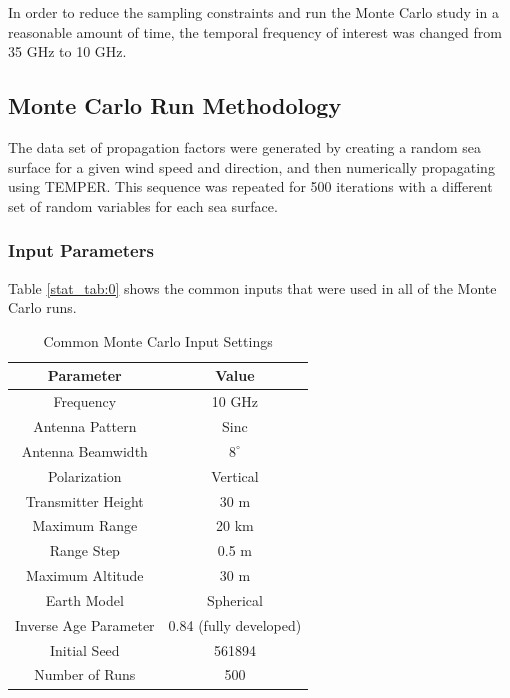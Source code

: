 In order to reduce the sampling constraints and run the Monte Carlo study in a reasonable amount of time, the temporal frequency of interest was changed from 35 GHz to 10 GHz.

\subsection{Monte Carlo Run Methodology}
The data set of propagation factors were generated by creating a random sea surface for a given wind speed and direction, and then numerically propagating using TEMPER. This sequence was repeated for 500 iterations with a different set of random variables for each sea surface.

\subsubsection{Input Parameters}
Table \ref{stat_tab:0} shows the common inputs that were used in all of the Monte Carlo runs.

\begin{table}[H]
  \begin{center}
      \renewcommand{\baselinestretch}{1} \small\normalsize
  \begin{quote}
    \caption[Common Monte Carlo Input Settings]{Common Monte Carlo Input Settings\label{stat_tab:1}}
  \end{quote}
  \begin{tabular} {|c | c |}
    \hline
  \bf{Parameter} & \bf{Value} \\ \hline
  Frequency & 10 GHz \\ \hline
  Antenna Pattern & Sinc \\ \hline
  Antenna Beamwidth & $8^{\circ}$  \\ \hline
  Polarization & Vertical \\ \hline
  Transmitter Height & 30 m \\ \hline
  Maximum Range & 20 km \\ \hline
  Range Step & 0.5 m  \\ \hline
  Maximum Altitude & 30 m \\ \hline
  Earth Model & Spherical \\ \hline
  Inverse Age Parameter & 0.84 (fully developed) \\ \hline
  Initial Seed & 561894\\ \hline
  Number of Runs & 500\\ \hline
\end{tabular}
\end{center}
\end{table}
\renewcommand{\baselinestretch}{2} \small\normalsize

